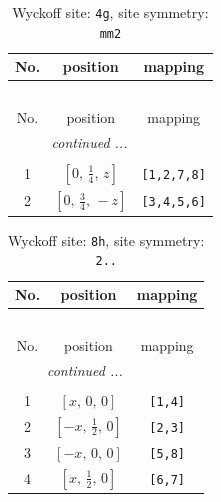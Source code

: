 \documentclass[fleqn,8pt]{jsarticle}
\begin{document}
\begin{longtable}{ccc}
\caption{Wyckoff site: {\tt 4g}, site symmetry: {\tt mm2}}
 \\
 \hline \hline
No. & position & mapping \\ \hline \endfirsthead

\multicolumn{2}{l}{\tablename\ \thetable{}} \\
 \hline \hline
No. & position & mapping \\ \hline \endhead

 \hline \hline
\multicolumn{2}{r}{\footnotesize\it continued ...} \\ \endfoot

 \hline \hline
\multicolumn{2}{r}{} \\ \endlastfoot

1 & $\left[ 0,\, \frac{1}{4},\, z \right]$ & {\tt [1,2,7,8]} \\ \hline
2 & $\left[ 0,\, \frac{3}{4},\, - z \right]$ & {\tt [3,4,5,6]} \\
\end{longtable}
\renewcommand{\arraystretch}{1.2}
\begin{longtable}{ccc}
\caption{Wyckoff site: {\tt 8h}, site symmetry: {\tt 2..}}
 \\
 \hline \hline
No. & position & mapping \\ \hline \endfirsthead

\multicolumn{2}{l}{\tablename\ \thetable{}} \\
 \hline \hline
No. & position & mapping \\ \hline \endhead

 \hline \hline
\multicolumn{2}{r}{\footnotesize\it continued ...} \\ \endfoot

 \hline \hline
\multicolumn{2}{r}{} \\ \endlastfoot

1 & $\left[ x,\, 0,\, 0 \right]$ & {\tt [1,4]} \\ \hline
2 & $\left[ - x,\, \frac{1}{2},\, 0 \right]$ & {\tt [2,3]} \\ \hline
3 & $\left[ - x,\, 0,\, 0 \right]$ & {\tt [5,8]} \\ \hline
4 & $\left[ x,\, \frac{1}{2},\, 0 \right]$ & {\tt [6,7]} \\
\end{longtable}
\renewcommand{\arraystretch}{1.2}
\end{document}
